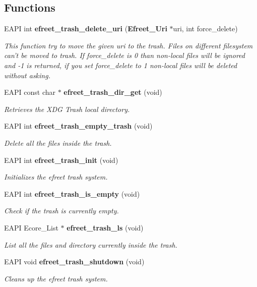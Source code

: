 \subsection*{Functions}
\begin{CompactItemize}
\item 
EAPI int {\bf efreet\_\-trash\_\-delete\_\-uri} ({\bf Efreet\_\-Uri} $\ast$uri, int force\_\-delete)
\begin{CompactList}\small\item\em This function try to move the given uri to the trash. Files on different filesystem can't be moved to trash. If force\_\-delete is 0 than non-local files will be ignored and -1 is returned, if you set force\_\-delete to 1 non-local files will be deleted without asking. \item\end{CompactList}\item 
EAPI const char $\ast$ {\bf efreet\_\-trash\_\-dir\_\-get} (void)
\begin{CompactList}\small\item\em Retrieves the XDG Trash local directory. \item\end{CompactList}\item 
EAPI int {\bf efreet\_\-trash\_\-empty\_\-trash} (void)
\begin{CompactList}\small\item\em Delete all the files inside the trash. \item\end{CompactList}\item 
EAPI int {\bf efreet\_\-trash\_\-init} (void)
\begin{CompactList}\small\item\em Initializes the efreet trash system. \item\end{CompactList}\item 
EAPI int {\bf efreet\_\-trash\_\-is\_\-empty} (void)
\begin{CompactList}\small\item\em Check if the trash is currently empty. \item\end{CompactList}\item 
EAPI Ecore\_\-List $\ast$ {\bf efreet\_\-trash\_\-ls} (void)
\begin{CompactList}\small\item\em List all the files and directory currently inside the trash. \item\end{CompactList}\item 
EAPI void {\bf efreet\_\-trash\_\-shutdown} (void)
\begin{CompactList}\small\item\em Cleans up the efreet trash system. \item\end{CompactList}\end{CompactItemize}
